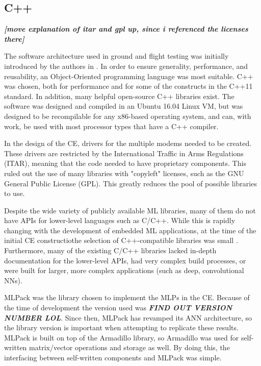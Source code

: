 \subsection{C++}
\par \textbf{\textit{[move explanation of itar and gpl up, since i referenced the licenses there]}}
\par The software architecture used in ground and flight testing was initially introduced by the authors in \cite{tim_implementation_paper}. In order to ensure generality, performance, and reusability, an Object-Oriented programming language was most suitable. C++ was chosen, both for performance and for some of the constructs in the C++11 standard. In addition, many helpful open-source C++ libraries exist. The software was designed and compiled in an Ubuntu 16.04 Linux VM, but was designed to be recompilable for any x86-based operating system, and can, with work, be used with most processor types that have a C++ compiler.
\par In the design of the CE, drivers for the multiple modems needed to be created. These drivers are restricted by the International Traffic in Arms Regulations (ITAR), meaning that the code needed to have proprietary components. This ruled out the use of many libraries with "copyleft" licenses, such as the GNU General Public License (GPL). This greatly reduces the pool of possible libraries to use. 
\par Despite the wide variety of publicly available ML libraries, many of them do not have APIs for lower-level languages such as C/C++. While this is rapidly changing with the development of embedded ML applications, at the time of the initial CE constructiothe selection of C++-compatible libraries was small \cite{tim_implementation_paper}. Furthermore, many of the existing C/C++ libraries lacked in-depth documentation for the lower-level APIs, had very complex build processes, or were built for larger, more complex applications (such as deep, convolutional NNs). 
\par MLPack \cite{placeholderCitation} was the library chosen to implement the MLPs in the CE. Because of the time of development the version used was \textbf{\textit{FIND OUT VERSION NUMBER LOL}}. Since then, MLPack has revamped its ANN architecture, so the library version is important when attempting to replicate these results. MLPack is built on top of the Armadillo \cite{placeholderCitation} library, so Armadillo was used for self-written matrix/vector operations and storage as well. By doing this, the interfacing between self-written components and MLPack was simple. 
